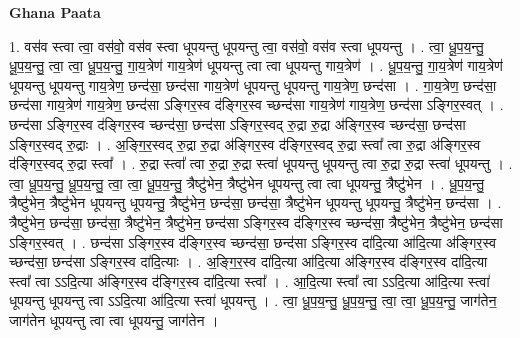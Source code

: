\documentclass[17pt]{extarticle}
\begin{document}
\textbf{Ghana Paata } \newline

1. वस॑व स्त्वा त्वा॒ वस॑वो॒ वस॑व स्त्वा धूपयन्तु धूपयन्तु त्वा॒ वस॑वो॒ वस॑व स्त्वा धूपयन्तु । . त्वा॒ धू॒प॒य॒न्तु॒ धू॒प॒य॒न्तु॒ त्वा॒ त्वा॒ धू॒प॒य॒न्तु॒ गा॒य॒त्रेण॑ गाय॒त्रेण॑ धूपयन्तु त्वा त्वा धूपयन्तु गाय॒त्रेण॑ । . धू॒प॒य॒न्तु॒ गा॒य॒त्रेण॑ गाय॒त्रेण॑ धूपयन्तु धूपयन्तु गाय॒त्रेण॒ छन्द॑सा॒ छन्द॑सा गाय॒त्रेण॑ धूपयन्तु धूपयन्तु गाय॒त्रेण॒ छन्द॑सा । . गा॒य॒त्रेण॒ छन्द॑सा॒ छन्द॑सा गाय॒त्रेण॑ गाय॒त्रेण॒ छन्द॑सा ऽङ्गिर॒स्व द॑ङ्गिर॒स्व च्छन्द॑सा गाय॒त्रेण॑ गाय॒त्रेण॒ छन्द॑सा ऽङ्गिर॒स्वत् । . छन्द॑सा ऽङ्गिर॒स्व द॑ङ्गिर॒स्व च्छन्द॑सा॒ छन्द॑सा ऽङ्गिर॒स्वद् रु॒द्रा रु॒द्रा अ॑ङ्गिर॒स्व च्छन्द॑सा॒ छन्द॑सा ऽङ्गिर॒स्वद् रु॒द्राः । . अ॒ङ्गि॒र॒स्वद् रु॒द्रा रु॒द्रा अ॑ङ्गिर॒स्व द॑ङ्गिर॒स्वद् रु॒द्रा स्त्वा᳚ त्वा रु॒द्रा अ॑ङ्गिर॒स्व द॑ङ्गिर॒स्वद् रु॒द्रा स्त्वा᳚ । . रु॒द्रा स्त्वा᳚ त्वा रु॒द्रा रु॒द्रा स्त्वा॑ धूपयन्तु धूपयन्तु त्वा रु॒द्रा रु॒द्रा स्त्वा॑ धूपयन्तु । . त्वा॒ धू॒प॒य॒न्तु॒ धू॒प॒य॒न्तु॒ त्वा॒ त्वा॒ धू॒प॒य॒न्तु॒ त्रैष्टु॑भेन॒ त्रैष्टु॑भेन धूपयन्तु त्वा त्वा धूपयन्तु॒ त्रैष्टु॑भेन । . धू॒प॒य॒न्तु॒ त्रैष्टु॑भेन॒ त्रैष्टु॑भेन धूपयन्तु धूपयन्तु॒ त्रैष्टु॑भेन॒ छन्द॑सा॒ छन्द॑सा॒ त्रैष्टु॑भेन धूपयन्तु धूपयन्तु॒ त्रैष्टु॑भेन॒ छन्द॑सा । . त्रैष्टु॑भेन॒ छन्द॑सा॒ छन्द॑सा॒ त्रैष्टु॑भेन॒ त्रैष्टु॑भेन॒ छन्द॑सा ऽङ्गिर॒स्व द॑ङ्गिर॒स्व च्छन्द॑सा॒ त्रैष्टु॑भेन॒ त्रैष्टु॑भेन॒ छन्द॑सा ऽङ्गिर॒स्वत् । . छन्द॑सा ऽङ्गिर॒स्व द॑ङ्गिर॒स्व च्छन्द॑सा॒ छन्द॑सा ऽङ्गिर॒स्व दा॑दि॒त्या आ॑दि॒त्या अ॑ङ्गिर॒स्व च्छन्द॑सा॒ छन्द॑सा ऽङ्गिर॒स्व दा॑दि॒त्याः । . अ॒ङ्गि॒र॒स्व दा॑दि॒त्या आ॑दि॒त्या अ॑ङ्गिर॒स्व द॑ङ्गिर॒स्व दा॑दि॒त्या स्त्वा᳚ त्वा ऽऽदि॒त्या अ॑ङ्गिर॒स्व द॑ङ्गिर॒स्व दा॑दि॒त्या स्त्वा᳚ । . आ॒दि॒त्या स्त्वा᳚ त्वा ऽऽदि॒त्या आ॑दि॒त्या स्त्वा॑ धूपयन्तु धूपयन्तु त्वा ऽऽदि॒त्या आ॑दि॒त्या स्त्वा॑ धूपयन्तु । . त्वा॒ धू॒प॒य॒न्तु॒ धू॒प॒य॒न्तु॒ त्वा॒ त्वा॒ धू॒प॒य॒न्तु॒ जाग॑तेन॒ जाग॑तेन धूपयन्तु त्वा त्वा धूपयन्तु॒ जाग॑तेन । \newline
\end{document}
